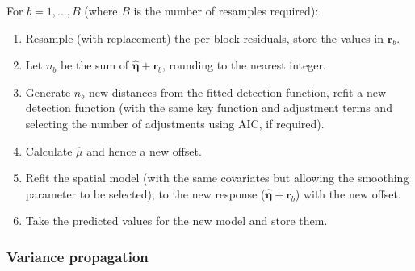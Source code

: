 \documentclass[a4paper,12pt]{article}
\begin{document}
For $b=1,\ldots,B$ (where $B$ is the number of resamples required):
\begin{enumerate}
	\item Resample (with replacement) the per-block residuals, store the values in $\mathbf{r}_{b}$.
	\item Let $n_b$ be the sum of $\hat{\bm{\eta}}+\mathbf{r}_{b}$, rounding to the nearest integer.
	\item Generate $n_b$ new distances from the fitted detection function, refit a new detection function (with the same key function and adjustment terms and selecting the number of adjustments using AIC, if required).
	\item Calculate $\hat{\mu}$ and hence a new offset.
	\item Refit the spatial model (with the same covariates but allowing the smoothing parameter to be selected), to the new response ($\hat{\bm{\eta}}+\mathbf{r}_{b}$) with the new offset.
	\item Take the predicted values for the new model and store them.
\end{enumerate}

\subsubsection*{Variance propagation}

\end{document}
